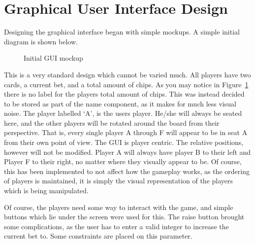 \section{Graphical User Interface Design}
Designing the graphical interface began with simple mockups. A simple
initial diagram is shown below.

\begin{figure}[h]
    \caption{Initial GUI mockup}%
    \label{fig:initialgui}
\end{figure}

This is a very standard design which cannot be varied much. All players have
two cards, a current bet, and a total amount of chips. As you may notice
in Figure~\ref{fig:initialgui} there is no label for the players total amount
of chips. This was instead decided to be stored as part of the name component,
as it makes for much less visual noise. The player labelled `A', is the
users player. He/she will always be seated here, and the other players will
be rotated around the board from their perspective. That is, every single
player A through F will appear to be in seat A from their own point of view.
The GUI is player centric. The relative positions, however will not be 
modified. Player A will always have player B to their left and Player F to 
their right, no matter where they visually appear to be. Of course, this has 
been implemented to not affect how the gameplay works, as the ordering of 
players is maintained, it is simply the visual representation of the players 
which is being manipulated.

Of course, the players need some way to interact with the game, and simple
buttons which lie under the screen were used for this. The raise button
brought some complications, as the user has to enter a valid integer to
increase the current bet to. Some constraints are placed on this parameter.

